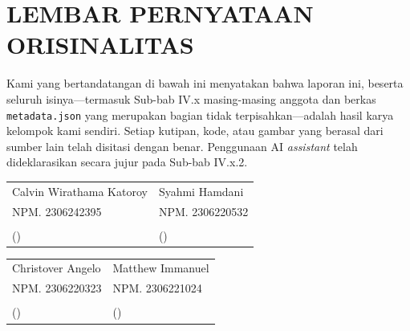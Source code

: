 \documentclass[11pt,a4paper,oneside]{report}
\begin{document}
\chapter*{LEMBAR PERNYATAAN ORISINALITAS}

Kami yang bertandatangan di bawah ini menyatakan bahwa laporan ini, beserta seluruh isinya---termasuk Sub-bab IV.x masing-masing anggota dan berkas \texttt{metadata.json} yang merupakan bagian tidak terpisahkan---adalah hasil karya kelompok kami sendiri. Setiap kutipan, kode, atau gambar yang berasal dari sumber lain telah disitasi dengan benar. Penggunaan AI \textit{assistant} telah dideklarasikan secara jujur pada Sub-bab IV.x.2.

\vspace{1.5cm}

\noindent
\begin{tabular}{p{}p{}}
\centering Calvin Wirathama Katoroy & \centering Syahmi Hamdani \tabularnewline
\centering NPM. 2306242395 & \centering NPM. 2306220532 \tabularnewline
\vspace{1.5cm} & \vspace{1.5cm} \tabularnewline
\centering (\hspace{4cm}) & \centering (\hspace{4cm}) \tabularnewline
\end{tabular}

\vspace{1cm}

\noindent
\begin{tabular}{p{}p{}}
\centering Christover Angelo & \centering Matthew Immanuel \tabularnewline
\centering NPM. 2306220323 & \centering NPM. 2306221024 \tabularnewline
\vspace{1.5cm} & \vspace{1.5cm} \tabularnewline
\centering (\hspace{4cm}) & \centering (\hspace{4cm}) \tabularnewline
\end{tabular}

\tableofcontents
\listoffigures
\listoftables
\end{document}
